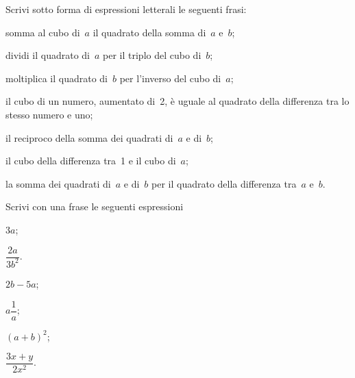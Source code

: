 \begin{esercizio}[\Ast]
\label{ese:9.10} %
Scrivi sotto forma di espressioni letterali le seguenti frasi:
 \begin{enumeratea}
 \item somma al cubo di~$a$ il quadrato della somma di~$a$ e~$b$;
 \item dividi il quadrato di~$a$ per il triplo del cubo di~$b$;
 \item moltiplica il quadrato di~$b$ per l'inverso del cubo di~$a$;
 \item il cubo di un numero, aumentato di~2, è uguale al quadrato della differenza tra lo stesso numero e uno;
 \item il reciproco della somma dei quadrati di~$a$ e di~$b$;
 \item il cubo della differenza tra~1 e il cubo di~$a$;
 \item la somma dei quadrati di~$a$ e di~$b$ per il quadrato della differenza tra~$a$ e~$b$.
 \end{enumeratea}
\end{esercizio}

\begin{esercizio}[\Ast]
\label{ese:9.11} %
Scrivi con una frase le seguenti espressioni
\begin{multicols}{3}
 \begin{enumeratea}
 \item $3a$;
 \item $\dfrac{2a}{3b^{2}}$.
 \item $2b-5a$;
 \item $a {\dfrac{1}{a}}$;
 \item $(a+b)^{2}$;
 \item $\dfrac{3x+y}{2x^{2}}$.
 \end{enumeratea}
\end{multicols}
\end{esercizio}


